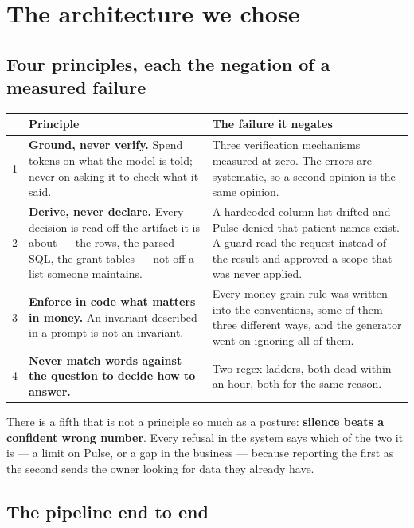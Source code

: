 \documentclass[11pt,a4paper]{report}
\begin{document}
\chapter{The architecture we chose}

\section{Four principles, each the negation of a measured failure}

\begin{center}
\small
\begin{tabular}{@{}p{0.6cm}p{5.4cm}p{8.6cm}@{}}
\toprule
& \textbf{Principle} & \textbf{The failure it negates}\\
\midrule
1 & \textbf{Ground, never verify.} Spend tokens on what the model is told; never on asking it to
    check what it said. & Three verification mechanisms measured at zero. The errors are
    systematic, so a second opinion is the same opinion.\\[2pt]
2 & \textbf{Derive, never declare.} Every decision is read off the artifact it is about --- the
    rows, the parsed SQL, the grant tables --- not off a list someone maintains. & A hardcoded
    column list drifted and Pulse denied that patient names exist. A guard read the request
    instead of the result and approved a scope that was never applied.\\[2pt]
3 & \textbf{Enforce in code what matters in money.} An invariant described in a prompt is not an
    invariant. & Every money-grain rule was written into the conventions, some of them three
    different ways, and the generator went on ignoring all of them.\\[2pt]
4 & \textbf{Never match words against the question to decide how to answer.} & Two regex ladders,
    both dead within an hour, both for the same reason.\\
\bottomrule
\end{tabular}
\end{center}

\noindent There is a fifth that is not a principle so much as a posture: \textbf{silence beats a
confident wrong number}. Every refusal in the system says which of the two it is --- a limit on
Pulse, or a gap in the business --- because reporting the first as the second sends the owner
looking for data they already have.

\section{The pipeline end to end}
\end{document}
